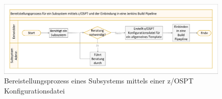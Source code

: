 \begin{figure}[ht!]
\centering
\includegraphics[width=\paperwidth,angle=90]{figures/swimlaneNeuerProzess.pdf}
\caption{Bereistellungsprozess eines Subsystems mittels einer z/OSPT Konfigurationsdatei}
\label{fig:proneu}
\end{figure}


